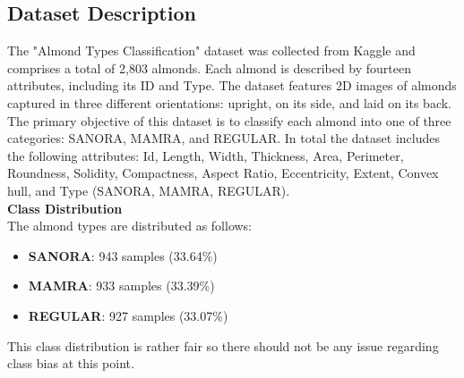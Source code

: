 \documentclass[conference]{IEEEtran}
\begin{document}
\subsection{Dataset Description}
The "Almond Types Classification" dataset was collected from Kaggle and comprises a total of 2,803 almonds. Each almond is described by fourteen attributes, including its ID and Type. The dataset features 2D images of almonds captured in three different orientations: upright, on its side, and laid on its back. The primary objective of this dataset is to classify each almond into one of three categories: SANORA, MAMRA, and REGULAR. In total the dataset includes the following attributes: Id, Length, Width, Thickness, Area, Perimeter, Roundness, Solidity, Compactness, Aspect Ratio, Eccentricity, Extent, Convex hull, and Type (SANORA, MAMRA, REGULAR).\\
\textbf{Class Distribution}\\
The almond types are distributed as follows:
\begin{itemize}
	\item \textbf{SANORA}: 943 samples (33.64\%)
	\item \textbf{MAMRA}: 933 samples (33.39\%)
	\item \textbf{REGULAR}: 927 samples (33.07\%)
\end{itemize}
This class distribution is rather fair so there should not be any issue regarding class bias at this point.
\end{document}
